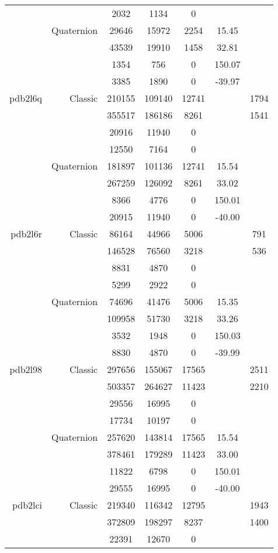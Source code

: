 \begin{xltabular}{\textwidth}{r|rcccSc}
& & 2032 & 1134 & 0 & & \\
& Quaternion & 29646 & 15972 & 2254 & 15.45 & \\
& & 43539 & 19910 & 1458 & 32.81 & \\
& & 1354 & 756 & 0 & 150.07 & \\
& & 3385 & 1890 & 0 & -39.97 & \\ \addlinespace
pdb2l6q & Classic & 210155 & 109140 & 12741 & & 1794 \\
& & 355517 & 186186 & 8261 & & 1541 \\
& & 20916 & 11940 & 0 & & \\
& & 12550 & 7164 & 0 & & \\
& Quaternion & 181897 & 101136 & 12741 & 15.54 & \\
& & 267259 & 126092 & 8261 & 33.02 & \\
& & 8366 & 4776 & 0 & 150.01 & \\
& & 20915 & 11940 & 0 & -40.00 & \\ \addlinespace
pdb2l6r & Classic & 86164 & 44966 & 5006 & & 791 \\
& & 146528 & 76560 & 3218 & & 536 \\
& & 8831 & 4870 & 0 & & \\
& & 5299 & 2922 & 0 & & \\
& Quaternion & 74696 & 41476 & 5006 & 15.35 & \\
& & 109958 & 51730 & 3218 & 33.26 & \\
& & 3532 & 1948 & 0 & 150.03 & \\
& & 8830 & 4870 & 0 & -39.99 & \\ \addlinespace
pdb2l98 & Classic & 297656 & 155067 & 17565 & & 2511 \\
& & 503357 & 264627 & 11423 & & 2210 \\
& & 29556 & 16995 & 0 & & \\
& & 17734 & 10197 & 0 & & \\
& Quaternion & 257620 & 143814 & 17565 & 15.54 & \\
& & 378461 & 179289 & 11423 & 33.00 & \\
& & 11822 & 6798 & 0 & 150.01 & \\
& & 29555 & 16995 & 0 & -40.00 & \\ \addlinespace
pdb2lci & Classic & 219340 & 116342 & 12795 & & 1943 \\
& & 372809 & 198297 & 8237 & & 1400 \\
& & 22391 & 12670 & 0 & & \\

\end{xltabular}
